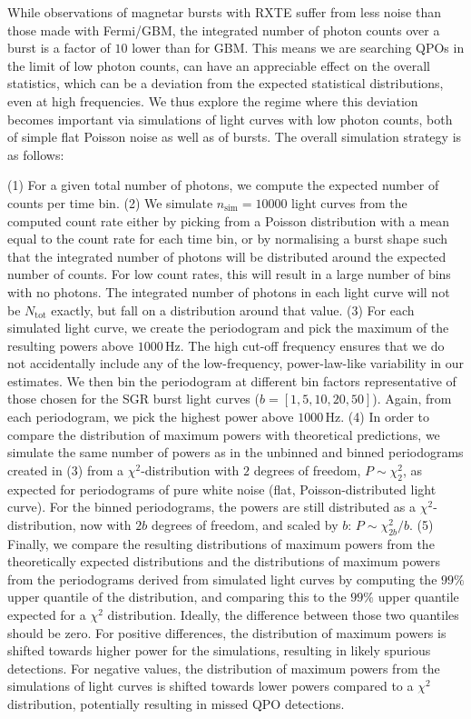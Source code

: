 \documentclass[numberedappendix]{emulateapj}
\newcommand{\hz}{\,\mathrm{Hz}}
\begin{document}
While observations of magnetar bursts with RXTE suffer from less noise than those made with Fermi/GBM, the integrated number of photon counts over a burst is a factor of $10$ lower than for GBM. This means we are searching QPOs in the limit of low photon counts, can have an appreciable effect on the overall statistics, which can be a deviation from the expected statistical distributions, even at high frequencies. We thus explore the regime where this deviation becomes important via simulations of light curves with low photon counts, both of simple flat Poisson noise as well as of bursts.
The overall simulation strategy is as follows:

(1) For a given total number of photons, we compute the expected number of counts per time bin. 
(2) We simulate $n_{\mathrm{sim}} = 10000$ light curves from the computed count rate either by picking from a Poisson distribution with a mean equal to the count rate for each time bin, or by normalising a burst shape such that the integrated number of photons will be distributed around the expected number of counts. For low count rates, this will result in a large number of bins with no photons. The integrated number of photons in each light curve will not be $N_{\mathrm{tot}}$ exactly, but fall on a distribution around that value.
(3) For each simulated light curve, we create the periodogram and pick the maximum of the resulting powers above $1000 \hz$. The high cut-off frequency ensures that we do not accidentally include any of the low-frequency, power-law-like variability in our estimates. We then bin the periodogram at different bin factors representative of those chosen for the SGR burst light curves ($b = [1, 5, 10, 20, 50]$). Again, from each periodogram, we pick the highest power above $1000 \hz$.
(4) In order to compare the distribution of maximum powers with theoretical predictions, we simulate the same number of powers as in the unbinned and binned periodograms created in (3) from a $\chi^2$-distribution with $2$ degrees of freedom, $P \sim \chi^2_2$, as expected for periodograms of pure white noise (flat, Poisson-distributed light curve). For the binned periodograms, the powers are still distributed as a $\chi^2$-distribution, now with $2b$ degrees of freedom, and scaled by $b$: $P \sim \chi^2_{2b}/b$.
(5) Finally, we compare the resulting distributions of maximum powers from the theoretically expected distributions and the distributions of maximum powers from the periodograms derived from simulated light curves by computing the $99\%$ upper quantile of the distribution, and comparing this to the $99\%$ upper quantile expected for a $\chi^2$ distribution. Ideally, the difference between those two quantiles should be zero. For positive differences, the distribution of maximum powers is shifted towards higher power for the simulations, resulting in likely spurious detections. For negative values, the distribution of maximum powers from the simulations of light curves is shifted towards lower powers compared to a $\chi^2$ distribution, potentially resulting in missed QPO detections.
\end{document}
